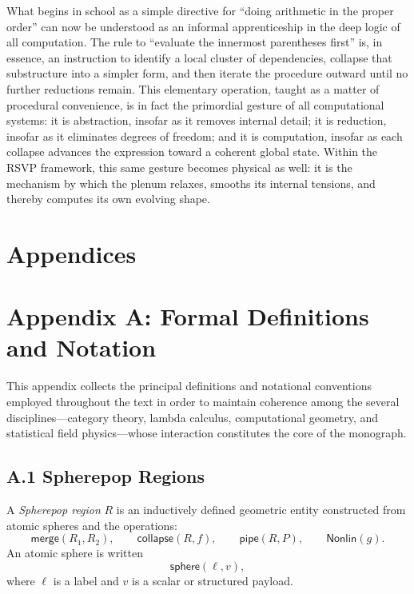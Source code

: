 \documentclass[12pt,letterpaper]{article}
\begin{document}
What begins in school as a simple directive for ``doing arithmetic in the proper
order'' can now be understood as an informal apprenticeship in the deep logic of
all computation.  The rule to ``evaluate the innermost parentheses first'' is, in
essence, an instruction to identify a local cluster of dependencies, collapse
that substructure into a simpler form, and then iterate the procedure outward
until no further reductions remain.  This elementary operation, taught as a
matter of procedural convenience, is in fact the primordial gesture of all
computational systems: it is abstraction, insofar as it removes internal detail;
it is reduction, insofar as it eliminates degrees of freedom; and it is
computation, insofar as each collapse advances the expression toward a coherent
global state.  Within the RSVP framework, this same gesture becomes physical as
well: it is the mechanism by which the plenum relaxes, smooths its internal
tensions, and thereby computes its own evolving shape.

\appendix
\section*{Appendices}


\section{Appendix A: Formal Definitions and Notation}

This appendix collects the principal definitions and notational conventions
employed throughout the text in order to maintain coherence among the several
disciplines---category theory, lambda calculus, computational geometry, and
statistical field physics---whose interaction constitutes the core of the
monograph.

\subsection*{A.1 Spherepop Regions}
A \emph{Spherepop region} $R$ is an inductively defined geometric entity constructed
from atomic spheres and the operations:
\[
\mathsf{merge}(R_1,R_2), 
\qquad
\mathsf{collapse}(R,f),
\qquad
\mathsf{pipe}(R,P),
\qquad
\mathsf{Nonlin}(g).
\]
An atomic sphere is written
\[
\mathsf{sphere}(\ell, v),
\]
where $\ell$ is a label and $v$ is a scalar or structured payload.
\end{document}
